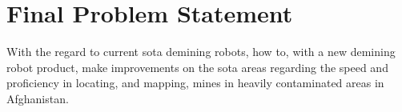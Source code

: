 \chapter{Final Problem Statement}


With the regard to current \gls{sota} demining robots, how to, with a new demining robot product, make improvements on the \gls{sota} areas regarding the speed and proficiency in locating, and mapping, mines in heavily contaminated areas in Afghanistan.




